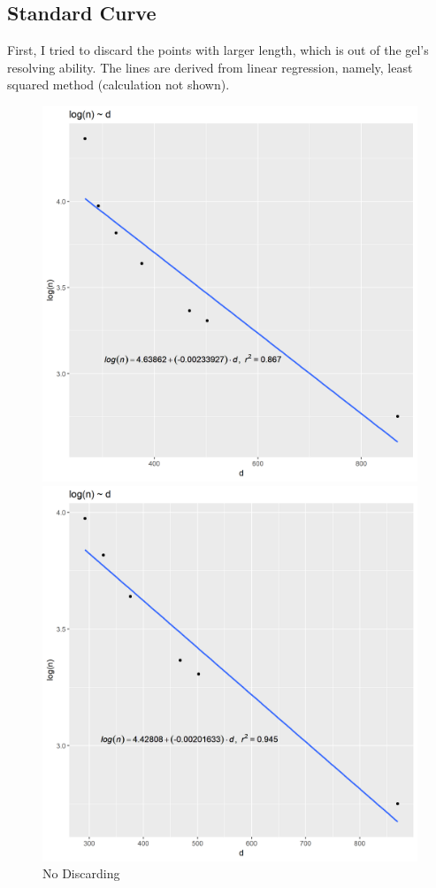 \documentclass{article}
\begin{document}
        \subsection{Standard Curve}
            First, I tried to discard the points with larger length, which is out of the gel's resolving ability. The lines are derived from linear regression, namely, least squared method (calculation not shown).
            \begin{figure}[H]
                \begin{minipage}[t]{0.5\textwidth}
                    \centering
                    \includegraphics[width = 0.8\linewidth]{../Data/discard_1.png}
                    \caption{No Discarding}
                    \label{dis.0}
                \end{minipage}
                \begin{minipage}[t]{0.5\textwidth}
                    \centering
                    \includegraphics[width = 0.8\linewidth]{../Data/discard_2.png}

\end{minipage}
\end{figure}
\end{document}
